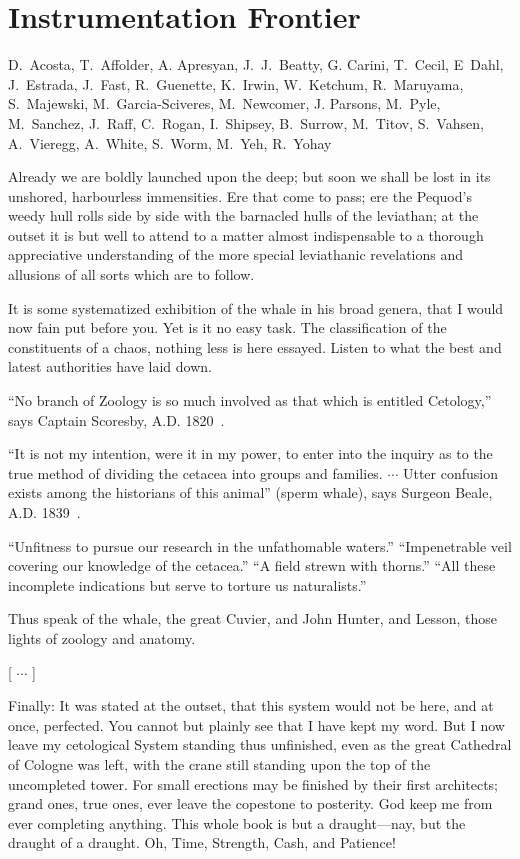 
\setcounter{chapter}{7} 

\chapter{Instrumentation Frontier}

   {D.~Acosta, T.~Affolder, A. Apresyan, J.~J.~Beatty, G. Carini, T.~Cecil, E~Dahl, J.~Estrada, 
J.~Fast, R.~Guenette,
K.~Irwin, W.~Ketchum,  R.~Maruyama,  S.~Majewski,  M.~Garcia-Sciveres, M.~Newcomer, J. Parsons, 
M.~Pyle, M.~Sanchez, J.~Raff, C.~Rogan, I.~Shipsey, B.~Surrow, M.~Titov, S.~Vahsen, 
A.~Vieregg, A.~White, S.~Worm, M.~Yeh, 
R.~Yohay}


Already we are boldly launched upon the deep; but soon we shall be lost in its unshored, harbourless immensities. Ere that come to pass; ere the Pequod’s weedy hull rolls side by side with the barnacled hulls of the leviathan; at the outset it is but well to attend to a matter almost indispensable to a thorough appreciative understanding of the more special leviathanic revelations and allusions of all sorts which are to follow.

It is some systematized exhibition of the whale in his broad genera, that I would now fain put before you. Yet is it no easy task. The classification of the constituents of a chaos, nothing less is here essayed. Listen to what the best and latest authorities have laid down.

``No branch of Zoology is so much involved as that which is entitled Cetology,'' says Captain Scoresby, A.D. 1820~\cite{I-Scoresby}.

``It is not my intention, were it in my power, to enter into the inquiry as to the true method of dividing the cetacea into groups and families. $\cdots$ Utter confusion exists among the historians of this animal'' (sperm whale), says Surgeon Beale, A.D. 1839~\cite{I-Beale}.

``Unfitness to pursue our research in the unfathomable waters.'' ``Impenetrable veil covering our knowledge of the cetacea.''  ``A field strewn with thorns.'' ``All these incomplete indications but serve to torture us naturalists.''

Thus speak of the whale, the great Cuvier, and John Hunter, and Lesson, those lights of zoology and anatomy.

 [ $\cdots$ ]

Finally: It was stated at the outset, that this system would not be here, and at once, perfected. You cannot but plainly see that I have kept my word. But I now leave my cetological System standing thus unfinished, even as the great Cathedral of Cologne was left, with the crane still standing upon the top of the uncompleted tower. For small erections may be finished by their first architects; grand ones, true ones, ever leave the copestone to posterity. God keep me from ever completing anything. This whole book is but a draught---nay, but the draught of a draught. Oh, Time, Strength, Cash, and Patience!



